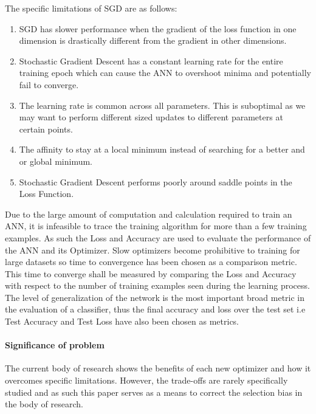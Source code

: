 \documentclass{article}
\begin{document}
	The specific limitations of SGD are as follows:
	\begin{enumerate}
		\item SGD has slower performance when the gradient of the loss function in one dimension is drastically different from the gradient in other dimensions.
		
		\item Stochastic Gradient Descent has a constant learning rate for the entire training epoch which can cause the ANN to overshoot minima and potentially fail to converge.
		
		\item The learning rate is common across all parameters. This is suboptimal as we may want to perform different sized updates to different parameters at certain points.
		
		\item The affinity to stay at a local minimum instead of searching for a better and or global minimum.
		
		\item Stochastic Gradient Descent performs poorly around saddle points in the Loss Function.
	\end{enumerate}


	Due to the large amount of computation and calculation required to train an ANN, it is infeasible to trace the training algorithm for more than a few training examples. As such the Loss and Accuracy are used to evaluate the performance of the ANN and its Optimizer. Slow optimizers become prohibitive to training for large datasets so time to convergence has been chosen as a comparison metric. This time to converge shall be measured by comparing the Loss and Accuracy with respect to the number of training examples seen during the learning process. The level of generalization of the network is the most important broad metric in the evaluation of a classifier, thus the final accuracy and loss over the test set i.e Test Accuracy and Test Loss have also been chosen as metrics. 
	
	\paragraph{Significance of problem}
	The current body of research shows the benefits of each new optimizer and how it overcomes specific limitations. However, the trade-offs are rarely specifically studied and as such this paper serves as a means to correct the selection bias in the body of research. 
	
\end{document}
